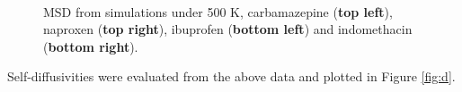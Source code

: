 \begin{figure}[]
	\centering
	\\
	\caption{MSD from simulations under 500 K, carbamazepine (\textbf{top left}), naproxen (\textbf{top right}), ibuprofen (\textbf{bottom left}) and indomethacin (\textbf{bottom right}).}
	\label{fig:msd_r2}    
\end{figure}

\newpage
Self-diffusivities were evaluated from the above data and plotted in Figure \ref{fig:d}. 

